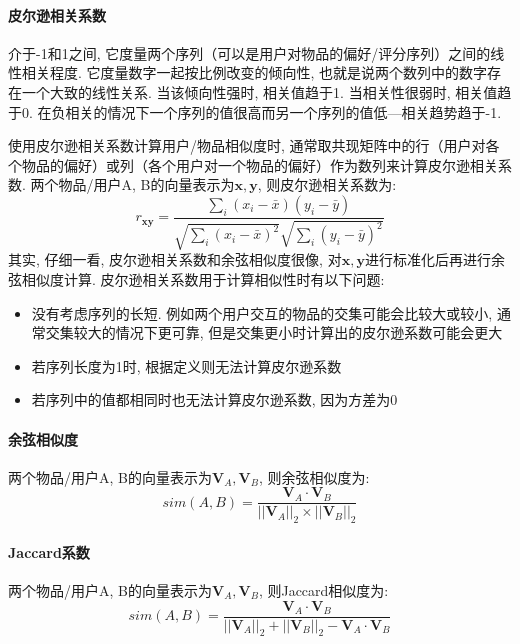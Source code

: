 \paragraph{皮尔逊相关系数}
介于-1和1之间, 它度量两个序列（可以是用户对物品的偏好/评分序列）之间的线性相关程度. 它度量数字一起按比例改变的倾向性, 也就是说两个数列中的数字存在一个大致的线性关系. 当该倾向性强时, 相关值趋于1. 当相关性很弱时, 相关值趋于0. 在负相关的情况下一个序列的值很高而另一个序列的值低---相关趋势趋于-1. 

使用皮尔逊相关系数计算用户/物品相似度时, 通常取共现矩阵中的行（用户对各个物品的偏好）或列（各个用户对一个物品的偏好）作为数列来计算皮尔逊相关系数. 两个物品/用户A, B的向量表示为$\boldsymbol{x}, \boldsymbol{y}$, 则皮尔逊相关系数为: 
$$
r_{\boldsymbol{xy}} = \frac{\sum_i (x_i - \bar{x})(y_i - \bar{y})}{\sqrt{\sum_i (x_i - \bar{x})^2} \sqrt{\sum_i (y_i - \bar{y})^2}}
$$
其实, 仔细一看, 皮尔逊相关系数和余弦相似度很像, 对$\boldsymbol{x}, \boldsymbol{y}$进行标准化后再进行余弦相似度计算. 皮尔逊相关系数用于计算相似性时有以下问题: 
\begin{itemize}
	\item 没有考虑序列的长短. 例如两个用户交互的物品的交集可能会比较大或较小, 通常交集较大的情况下更可靠, 但是交集更小时计算出的皮尔逊系数可能会更大
	\item 若序列长度为1时, 根据定义则无法计算皮尔逊系数
	\item 若序列中的值都相同时也无法计算皮尔逊系数, 因为方差为0
\end{itemize}


\paragraph{余弦相似度}
两个物品/用户A, B的向量表示为$\boldsymbol{V}_A, \boldsymbol{V}_B$, 则余弦相似度为: 
$$
sim(A, B) = \frac{\boldsymbol{V}_A \cdot \boldsymbol{V}_B}{||\boldsymbol{V}_A||_2 \times ||\boldsymbol{V}_B||_2}
$$

\paragraph{Jaccard系数}
两个物品/用户A, B的向量表示为$\boldsymbol{V}_A, \boldsymbol{V}_B$, 则Jaccard相似度为: 
$$
sim(A, B) = \frac{\boldsymbol{V}_A \cdot \boldsymbol{V}_B}{||\boldsymbol{V}_A||_2 + ||\boldsymbol{V}_B||_2 - \boldsymbol{V}_A \cdot \boldsymbol{V}_B}
$$


